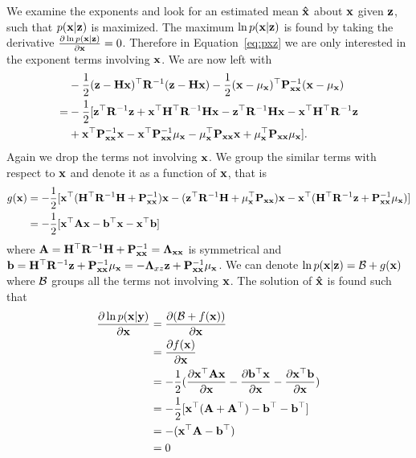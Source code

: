 We examine the exponents and look for an estimated mean ${\bf\hat x}$ about $\bf x$ given $\bf z$, such that $p(\bf x|\bf z)$ is maximized. The maximum $\ln p(\bf x|\bf z)$ is found by taking the derivative $\frac{\partial\ln p(\bf x|\bf z)}{\partial\bf x}=0$. Therefore in Equation~\eqref{eq:pxz} we are only interested in the exponent terms involving $\bf x$. We are now left with
\begin{equation}
\begin{split}
&-\frac{1}{2}({\bf z}-{\bf H}{\bf x})^\top
{\bf R}^{-1}({\bf z}-{\bf H}{\bf x})-\frac{1}{2}({\bf x}-\mu_{\bf x})^\top
{\bf P}_{\bf xx}^{-1}({\bf x}-\mu_{\bf x})\\
=&-\frac{1}{2}[{\bf z}^\top{\bf R}^{-1}{\bf z}+{\bf x}^\top{\bf H}^\top{\bf R}^{-1}{\bf H}{\bf x}-{\bf z}^\top{\bf R}^{-1}{\bf H}{\bf x}-{\bf x}^\top{\bf H}^\top{\bf R}^{-1}{\bf z} \\
&+{\bf x}^\top{\bf P}_{\bf xx}^{-1}{\bf x}-{\bf x}^\top{\bf P}_{\bf xx}^{-1}\mu_{\bf x}-\mu_{\bf x}^\top{\bf P}_{\bf xx}{\bf x}+\mu_{\bf x}^\top{\bf P}_{\bf xx}\mu_{\bf x}].
\end{split}
\end{equation}
Again we drop the terms not involving $\bf x$. We group the similar terms with respect to ${\bf x}$ and denote it as a function of $\bf x$, that is
\begin{equation}
\begin{split}
g(\bf x)&=-\frac{1}{2}[{\bf x}^\top({\bf H}^\top{\bf R}^{-1}{\bf H}+{\bf P}_{\bf xx}^{-1}){\bf x}-({\bf z}^\top{\bf R}^{-1}{\bf H}+\mu_{\bf x}^\top{\bf P}_{\bf xx}){\bf x}-{\bf x}^\top({\bf H}^\top{\bf R}^{-1}{\bf z}+{\bf P}_{\bf xx}^{-1}\mu_{\bf x})]\\
&=-\frac{1}{2}[{\bf x}^\top{\bf A}{\bf x}-{\bf b}^\top{\bf x}-{\bf x}^\top{\bf b}]
\end{split}
\end{equation}
where ${\bf A}={\bf H}^\top{\bf R}^{-1}{\bf H}+{\bf P}_{\bf xx}^{-1}={\bf \Lambda}_{\bf xx}$ is symmetrical and ${\bf b}={\bf H}^\top{\bf R}^{-1}{\bf z}+{\bf P}_{\bf xx}^{-1}\mu_{\bf x}=-{\bf \Lambda}_{xz}{\bf z}+{\bf P}_{\bf xx}^{-1}\mu_{\bf x}$. We can denote $\ln p({\bf x}|{\bf z})={\bf\mathcal{ B}}+g(\bf x)$ where ${\bf\mathcal{ B}}$ groups all the terms not involving $\bf x$. The solution of ${\bf \hat x}$ is found such that
\begin{equation}
\begin{split}
\frac{\partial\ln p(\bf x|\bf y)}{\partial\bf x}&=\frac{\partial({\bf\mathcal{B}}+f(\bf x))}{\partial\bf x} \\
&=\frac{\partial f(\bf x)}{\partial\bf x} \\
&=-\frac{1}{2}(\frac{\partial{\bf x}^\top{\bf A}{\bf x}}{\partial{\bf x}}-\frac{\partial{\bf b}^\top{\bf x}}{\partial{\bf x}}-\frac{\partial{\bf x}^\top{\bf b}}{\partial{\bf x}})\\
&=-\frac{1}{2}[{\bf x}^\top({\bf A}+{\bf A}^\top)-{\bf b}^\top-{\bf b}^\top] \\
&=-({\bf x}^\top{\bf A}-{\bf b}^\top) \\
&=0
\end{split}
\end{equation}
